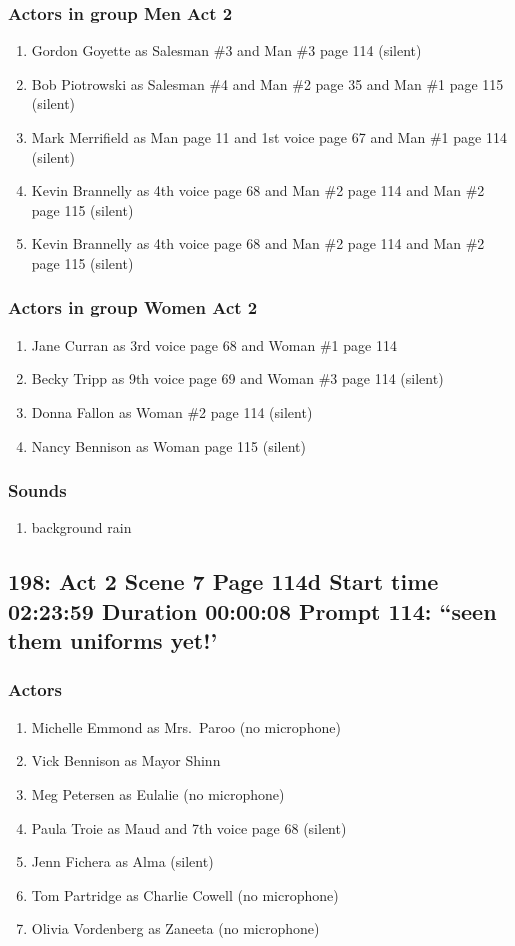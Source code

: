 \subsubsection{Actors in group Men Act 2}
\begin{enumerate}
\item Gordon Goyette as Salesman \#3 and Man \#3 page 114 (silent)
\item Bob Piotrowski as Salesman \#4 and Man \#2 page 35 and Man \#1 page 115 (silent)
\item Mark Merrifield as Man page 11 and 1st voice page 67 and Man \#1 page 114 (silent)
\item Kevin Brannelly as 4th voice page 68 and Man \#2 page 114 and Man \#2 page 115 (silent)
\item Kevin Brannelly as 4th voice page 68 and Man \#2 page 114 and Man \#2 page 115 (silent)
\end{enumerate}
\subsubsection{Actors in group Women Act 2}
\begin{enumerate}
\item Jane Curran as 3rd voice page 68 and Woman \#1 page 114
\item Becky Tripp as 9th voice page 69 and Woman \#3 page 114 (silent)
\item Donna Fallon as Woman \#2 page 114 (silent)
\item Nancy Bennison as Woman page 115 (silent)
\end{enumerate}

\subsubsection{Sounds}
\begin{enumerate}
\item background rain
\end{enumerate}
\subsection{198: Act 2 Scene 7 Page 114d Start time 02:23:59 Duration 00:00:08 Prompt 114: ``seen them uniforms yet!'}

\subsubsection{Actors}
\begin{enumerate}
\item Michelle Emmond as Mrs.~Paroo (no microphone)
\item Vick Bennison as Mayor Shinn
\item Meg Petersen as Eulalie (no microphone)
\item Paula Troie as Maud and 7th voice page 68 (silent)
\item Jenn Fichera as Alma (silent)
\item Tom Partridge as Charlie Cowell (no microphone)
\item Olivia Vordenberg as Zaneeta (no microphone)
\end{enumerate}
